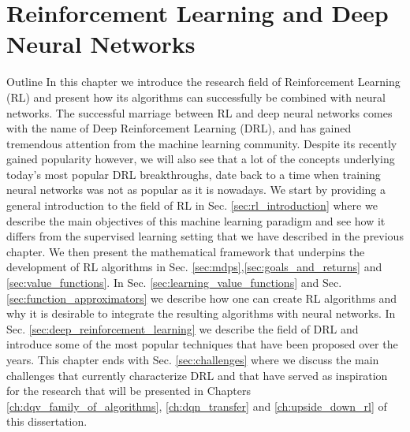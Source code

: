 \chapter{Reinforcement Learning and Deep Neural Networks}
\label{ch:reinforcement_learning}


\begin{remark}{Outline}
In this chapter we introduce the research field of Reinforcement Learning (RL) and present how its algorithms can successfully be combined with neural networks. The successful marriage between RL and deep neural networks comes with the name of Deep Reinforcement Learning (DRL), and has gained tremendous attention from the machine learning community. Despite its recently gained popularity however, we will also see that a lot of the concepts underlying today's most popular DRL breakthroughs, date back to a time when training neural networks was not as popular as it is nowadays. We start by providing a general introduction to the field of RL in Sec. \ref{sec:rl_introduction} where we describe the main objectives of this machine learning paradigm and see how it differs from the supervised learning setting that we have described in the previous chapter. We then present the mathematical framework that underpins the development of RL algorithms in Sec. \ref{sec:mdps},\ref{sec:goals_and_returns} and \ref{sec:value_functions}. In Sec. \ref{sec:learning_value_functions} and Sec. \ref{sec:function_approximators} we describe how one can create RL algorithms and why it is desirable to integrate the resulting algorithms with neural networks. In Sec. \ref{sec:deep_reinforcement_learning} we describe the field of DRL and introduce some of the most popular techniques that have been proposed over the years. This chapter ends with Sec. \ref{sec:challenges} where we discuss the main challenges that currently characterize DRL and that have served as inspiration for the research that will be presented in Chapters \ref{ch:dqv_family_of_algorithms}, \ref{ch:dqn_transfer} and \ref{ch:upside_down_rl} of this dissertation.

\end{remark}

